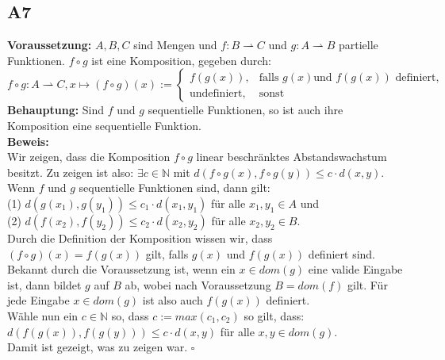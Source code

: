 \documentclass[12pt, a4paper]{article}
\newcommand*{\qed}{\null\nobreak\hfill\ensuremath{\square}}
\begin{document}
\subsection*{A7}
\textbf{Voraussetzung:} \(A,B,C\) sind Mengen und \(f: B \rightharpoonup C\) und \(g: A \rightharpoonup B\) partielle Funktionen. \(f \circ g\) 
ist eine Komposition, gegeben durch:\\
\begin{equation*}
    f \circ g : A \rightharpoonup C, x \mapsto (f \circ g)(x) :=
    \begin{cases}
    f(g(x)), & \text{falls } g(x) \text{und } f(g(x)) \text{ definiert,} \\
    \text{undefiniert}, & \text{sonst}
    \end{cases}
\end{equation*}
\textbf{Behauptung:} Sind \(f\) und \(g\) sequentielle Funktionen, so ist auch ihre Komposition eine sequentielle Funktion.\\
\textbf{Beweis:} \\
Wir zeigen, dass die Komposition \(f \circ g\) linear beschränktes Abstandswachstum besitzt. Zu zeigen ist also:
\(\exists c \in \mathbb{N}\) mit \(d(f \circ g(x), f \circ g(y)) \leq c \cdot d(x,y)\).\\
Wenn \(f\) und \(g\) sequentielle Funktionen sind, dann gilt:\\
(1) \(d(g(x_1),g(y_1)) \leq c_1 \cdot d(x_1, y_1)\) für alle \(x_1,y_1 \in A\) und\\
(2) \(d(f(x_2),f(y_2)) \leq c_2 \cdot d(x_2, y_2)\) für alle \(x_2,y_2 \in B\).\\
Durch die Definition der Komposition wissen wir, dass \((f \circ g)(x) = f(g(x))\) gilt, falls \(g(x)\) und \(f(g(x))\) definiert sind.\\
Bekannt durch die Voraussetzung ist, wenn ein \(x \in dom(g)\) eine valide Eingabe ist, dann bildet \(g\) auf \(B\) ab, wobei nach 
Voraussetzung \(B = dom(f)\) gilt. Für jede Eingabe \(x \in dom(g)\) ist also auch \(f(g(x))\) definiert.\\
Wähle nun ein \(c \in \mathbb{N}\) so, dass \(c := max(c_1, c_2)\) so gilt, dass:\\
\(d(f(g(x)), f(g(y))) \leq c \cdot d(x,y)\) für alle \(x,y \in dom(g)\).\\
Damit ist gezeigt, was zu zeigen war. \qed
\end{document}
